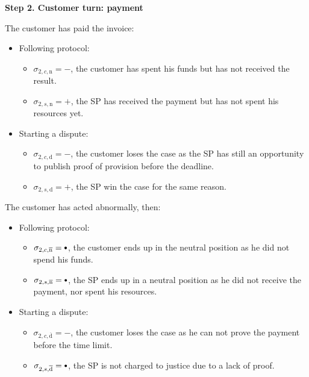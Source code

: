 \documentclass{ieeeaccess}
\newcommand\sbullet[1][.75]{\mathbin{\ThisStyle{\vcenter{\hbox{%
  \scalebox{#1}{$\SavedStyle\bullet$}}}}}%
}
\begin{document}
\noindent \textbf
{Step 2. Customer turn: payment}\label{step-2-pay-for-invoice}

The customer has paid the invoice:

\begin{itemize}
\item
  Following protocol:
  \begin{itemize}
  \item
    \(\sigma_{2, c, \mathrm{n}} = -\), the customer has spent his funds but has not received the result.
  \item
    \(\sigma_{2, s, \mathrm{n}} = +\), the SP has received the payment but has not spent his resources yet.
  \end{itemize}
\item
  Starting a dispute:

  \begin{itemize}
  \item
    \(\sigma_{2, c, \mathrm{d}} = -\), the customer loses the case as the SP has still an opportunity to publish proof of provision before the deadline.
  \item
    \(\sigma_{2, s, \mathrm{d}} = +\), the SP win the case for the same reason.
  \end{itemize}
\end{itemize}

The customer has acted abnormally, then:

\begin{itemize}
\item
  Following protocol:
  \begin{itemize}
  \item
    \(\sigma_{2, c, \overline{\mathrm{n}}} = \sbullet\), the customer ends up in the neutral position as he did not spend his funds.
  \item
    \(\sigma_{2, s, \overline{\mathrm{n}}} = \sbullet\), the SP ends up in a neutral position as he did not receive the payment, nor spent his resources.
  \end{itemize}
\item
  Starting a dispute:

  \begin{itemize}
  
  \item
    \(\sigma_{2, c, \overline{\mathrm{d}}} = -\), the customer loses the case as he can not prove the payment before the time limit.
  \item
    \(\sigma_{2, s, \overline{\mathrm{d}}} = \sbullet\), the SP is not charged to justice due to a lack of proof.
  \end{itemize}
\end{itemize}
\end{document}
